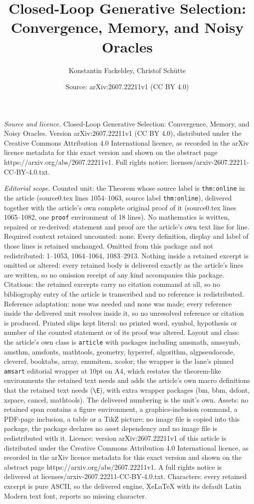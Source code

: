\documentclass[10pt,a4paper]{amsart}
\title[Closed-Loop Generative Selection: Convergence, Memory, and N]{Closed-Loop Generative Selection: Convergence, Memory, and Noisy Oracles}
\author{Konstantin Fackeldey, Christof Sch\"utte}
\date{Source: arXiv:2607.22211v1 (CC BY 4.0)}
\begin{document}
\maketitle

\noindent\emph{Source and licence.} Closed-Loop Generative Selection: Convergence, Memory, and Noisy Oracles. Version arXiv:2607.22211v1 (CC BY 4.0), distributed under the Creative Commons Attribution 4.0 International licence, as recorded in the arXiv licence metadata for this exact version and shown on the abstract page https://arxiv.org/abs/2607.22211v1. Full rights notice: licenses/arxiv-2607.22211-CC-BY-4.0.txt.\par\smallskip

\noindent\textit{Editorial scope.} Counted unit: the Theorem whose source label is \texttt{thm:online} in the article (source0.tex lines 1054--1063, source label \texttt{thm:online}), delivered together with the article's own complete original proof of it (source0.tex lines 1065--1082, one \texttt{proof} environment of 18 lines). No mathematics is written, repaired or re-derived: statement and proof are the article's own text line for line. Required context retained uncounted: none. Every definition, display and label of those lines is retained unchanged. Omitted from this package and not redistributed: 1--1053, 1064--1064, 1083--2913. Nothing inside a retained excerpt is omitted or altered: every retained body is delivered exactly as the article's lines are written, so no omission receipt of any kind accompanies this package. Citations: the retained excerpts carry no citation command at all, so no bibliography entry of the article is transcribed and no reference is redistributed. Reference adaptation: none was needed and none was made; every reference inside the delivered unit resolves inside it, so no unresolved reference or citation is produced. Printed slips kept literal: no printed word, symbol, hypothesis or number of the counted statement or of its proof was altered. Layout and class: the article's own class is \texttt{article} with packages including amsmath, amssymb, amsthm, amsfonts, mathtools, geometry, hyperref, algorithm, algpseudocode, cleveref, booktabs, array, enumitem, xcolor; the wrapper is the lane's pinned \texttt{amsart} editorial wrapper at 10pt on A4, which restates the theorem-like environments the retained text needs and adds the article's own macro definitions that the retained text needs (\texttt{\textbackslash E}), with extra wrapper packages (bm, bbm, dsfont, xspace, cancel, mathtools). The delivered numbering is the unit's own. Assets: no retained span contains a figure environment, a graphics-inclusion command, a PDF-page inclusion, a table or a TikZ picture; no image file is copied into this package, the package declares no asset dependency and no image file is redistributed with it. Licence: version arXiv:2607.22211v1 of this article is distributed under the Creative Commons Attribution 4.0 International licence, as recorded in the arXiv licence metadata for this exact version and shown on the abstract page https://arxiv.org/abs/2607.22211v1. A full rights notice is delivered at licenses/arxiv-2607.22211-CC-BY-4.0.txt. Characters: every retained excerpt is pure ASCII, so the delivered engine, XeLaTeX with its default Latin Modern text font, reports no missing character.
\end{document}
